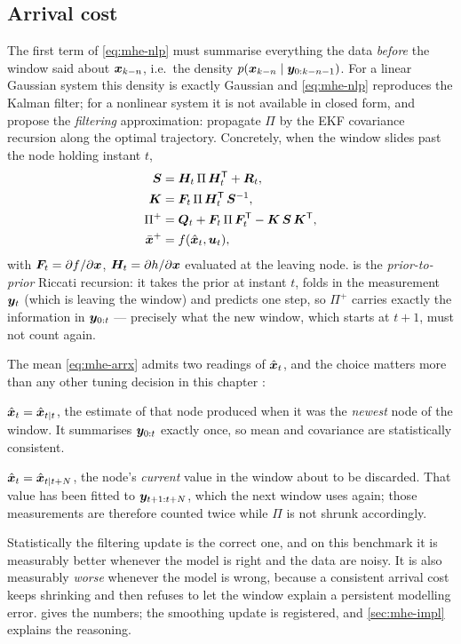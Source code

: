 \subsection{Arrival cost}
The first term of \cref{eq:mhe-nlp} must summarise everything the data \emph{before} the window
said about $\bm{x}_{k-n}$, i.e.\ the density $p(\bm{x}_{k-n}\mid \bm{y}_{0:k-n-1})$.  For a linear Gaussian
system this density is exactly Gaussian and \cref{eq:mhe-nlp} reproduces the Kalman filter; for a
nonlinear system it is not available in closed form, and \citet{rao2003mhe} propose the
\emph{filtering} approximation: propagate $\Pi$ by the EKF covariance recursion along the optimal
trajectory.  Concretely, when the window slides past the node holding instant $t$,
\begin{align}
\bm{S} &= \bm{H}_t\,\Pi\,\bm{H}_t^{\mathsf{T}} + \bm{R}_t, \label{eq:mhe-arrS}\\
\bm{K} &= \bm{F}_t\,\Pi\,\bm{H}_t^{\mathsf{T}}\,\bm{S}^{-1}, \label{eq:mhe-arrK}\\
\Pi^{+} &= \bm{Q}_t + \bm{F}_t\,\Pi\,\bm{F}_t^{\mathsf{T}} - \bm{K}\,\bm{S}\,\bm{K}^{\mathsf{T}}, \label{eq:mhe-arrP}\\
\bar{\bm{x}}^{+} &= f(\hat{\bm{x}}_t, \bm{u}_t), \label{eq:mhe-arrx}
\end{align}
with $\bm{F}_t = \partial f/\partial\bm{x}$, $\bm{H}_t = \partial h/\partial\bm{x}$ evaluated at the leaving
node.   is the \emph{prior-to-prior} Riccati recursion: it takes
the prior at instant $t$, folds in the measurement $\bm{y}_t$ (which is leaving the window) and
predicts one step, so $\Pi^{+}$ carries exactly the information in $\bm{y}_{0:t}$ --- precisely what
the new window, which starts at $t+1$, must not count again.

The mean \cref{eq:mhe-arrx} admits two readings of $\hat{\bm{x}}_t$, and the choice matters more than
any other tuning decision in this chapter \citep[Sec.~4.3.2]{rawlings2017mpc}:
\begin{description}[leftmargin=2.2em,style=nextline]
\item[Filtering update] $\hat{\bm{x}}_t = \hat{\bm{x}}_{t|t}$, the estimate of that node produced when it was
the \emph{newest} node of the window.  It summarises $\bm{y}_{0:t}$ exactly once, so mean and
covariance are statistically consistent.
\item[Smoothing update] $\hat{\bm{x}}_t = \hat{\bm{x}}_{t|t+N}$, the node's \emph{current} value in the window
about to be discarded.  That value has been fitted to $\bm{y}_{t+1:t+N}$, which the next window uses
again; those measurements are therefore counted twice while $\Pi$ is not shrunk accordingly.
\end{description}
Statistically the filtering update is the correct one, and on this benchmark it is measurably
better whenever the model is right and the data are noisy.  It is also measurably \emph{worse}
whenever the model is wrong, because a consistent arrival cost keeps shrinking and then refuses to
let the window explain a persistent modelling error.   gives the numbers;
the smoothing update is registered, and \cref{sec:mhe-impl} explains the reasoning.

